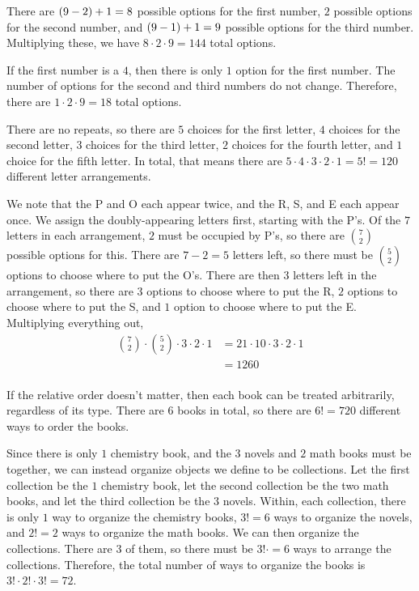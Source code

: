 \documentclass{article}
\begin{document}
\setcounter{problem}{4} 
\problem{}

There are $\left (9-2 \right)+1 = 8$ possible options for the first number, $2$ possible options for the second number, and $\left (9-1 \right)+1 = 9$ possible options for the third number.
Multiplying these, we have $8 \cdot 2 \cdot 9 = \boxed{144}$ total options.

If the first number is a $4$, then there is only $1$ option for the first number.
The number of options for the second and third numbers do not change.
Therefore, there are $1 \cdot 2 \cdot 9 = \boxed{18}$ total options.



\setcounter{problem}{7}
\problem{}
\subproblema{}

There are no repeats, so there are $5$ choices for the first letter, $4$ choices for the second letter, $3$ choices for the third letter, $2$ choices for the fourth letter, and $1$ choice for the fifth letter.
In total, that means there are $5 \cdot 4 \cdot 3 \cdot 2 \cdot 1 = 5! = \boxed{120}$ different letter arrangements.

\vspace{-4\parskip}
\subproblema{}
We note that the P and O each appear twice, and the R, S, and E each appear once.
We assign the doubly-appearing letters first, starting with the P's.
Of the $7$ letters in each arrangement, $2$ must be occupied by P's, so there are
$\binom{7}{2}$ possible options for this.
There are $7-2=5$ letters left, so there must be $\binom{5}{2}$ options to choose where to put the O's.
There are then $3$ letters left in the arrangement, so there are $3$ options to choose where to put the R, $2$ options to choose where to put the S, and $1$ option to choose where to put the E.
Multiplying everything out,
\begin{align*}
  \binom{7}{2} \cdot \binom{5}{2} \cdot 3 \cdot 2 \cdot 1 &= 21 \cdot 10 \cdot 3 \cdot 2 \cdot 1 \\
                                                          &= \boxed{1260} \\
\end{align*}

\setcounter{problem}{10}
\vspace{-4\parskip}
\problem{}
\subproblema{}
If the relative order doesn't matter, then each book can be treated arbitrarily, regardless of its type.
There are $6$ books in total, so there are $6! = \boxed{720}$ different ways to order the books.

\vspace{-4\parskip}
\subproblema{}
Since there is only $1$ chemistry book, and the $3$ novels and $2$ math books must be together, we can instead organize objects we define to be collections.
Let the first collection be the $1$ chemistry book, let the second collection be the two math books, and let the third collection be the $3$ novels.
Within, each collection, there is only $1$ way to organize the chemistry books, $3! = 6$ ways to organize the novels, and $2! = 2$ ways to organize the math books.
We can then organize the collections.
There are 3 of them, so there must be $3! \cdot  = 6$ ways to arrange the collections.
Therefore, the total number of ways to organize the books is $3! \cdot 2! \cdot 3! = \boxed{72}$.
\end{document}
